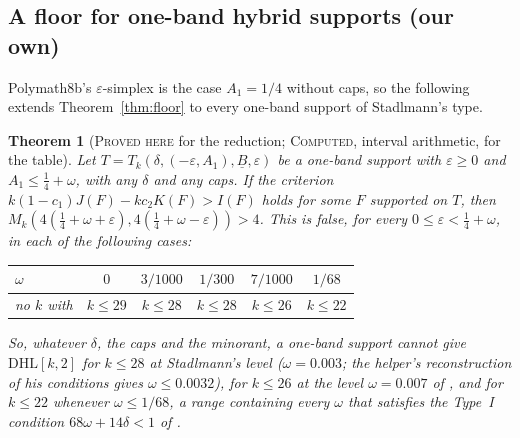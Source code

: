 \documentclass[11pt]{amsart}
\newtheorem{theorem}{Theorem}
\theoremstyle{definition}
\theoremstyle{remark}
\newcommand{\lbl}[1]{\textup{\textsc{#1}}}
\newcommand{\DHL}{\mathrm{DHL}}
\begin{document}
\subsection*{A floor for one-band hybrid supports (our own)}
Polymath8b's $\varepsilon$-simplex is the case $A_1=1/4$ without caps, so the
following extends Theorem~\ref{thm:floor} to every one-band support of
Stadlmann's type.

\begin{theorem}[\lbl{Proved here} for the reduction; \lbl{Computed}, interval arithmetic, for the table]\label{thm:hybrid-floor}
Let $T=T_k(\delta,(-\varepsilon,A_1),\underline B,\varepsilon)$ be a one-band
support with $\varepsilon\ge0$ and $A_1\le\frac14+\omega$, with any $\delta$
and any caps. If the criterion $k(1-c_1)J(F)-kc_2K(F)>I(F)$ holds for some
$F$ supported on $T$, then
$M_k\left(4(\tfrac14+\omega+\varepsilon),4(\tfrac14+\omega-\varepsilon)\right)>4$. This
is false, for every $0\le\varepsilon<\frac14+\omega$, in each of the
following cases:
\begin{center}
\begin{tabular}{@{}lccccc@{}}
\toprule
$\omega$ & $0$ & $3/1000$ & $1/300$ & $7/1000$ & $1/68$\\
\midrule
no $k$ with & $k\le29$ & $k\le28$ & $k\le28$ & $k\le26$ & $k\le22$\\
\bottomrule
\end{tabular}
\end{center}
So, whatever $\delta$, the caps and the minorant, a one-band support cannot give
$\DHL[k,2]$ for $k\le28$ at Stadlmann's level ($\omega=0.003$; the helper's
reconstruction of his conditions gives $\omega\le0.0032$), for $k\le26$ at the
level $\omega=0.007$ of \cite{Cha26}, and for $k\le22$ whenever
$\omega\le1/68$, a range containing every $\omega$ that satisfies the
Type~I condition $68\omega+14\delta<1$ of \cite[Lemma~5]{Sta26}.
\end{theorem}
\end{document}
